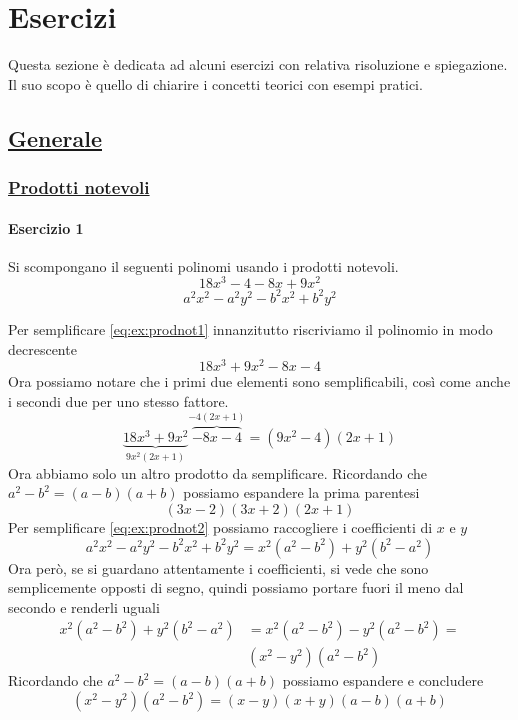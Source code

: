 
\section{Esercizi}
Questa sezione è dedicata ad alcuni esercizi con relativa risoluzione e spiegazione. Il suo scopo
è quello di chiarire i concetti teorici con esempi pratici.

\subsection*{\hyperref[sec:gen]{Generale}}\label{ex:generale}

\subsubsection*{\hyperref[subsec:gen:prodnot]{Prodotti notevoli}}
\paragraph{Esercizio 1}
Si scompongano il seguenti polinomi usando i prodotti notevoli.
\begin{equation}\label{eq:ex:prodnot1}
18x^3 - 4 -8x + 9x^2
\end{equation}
\begin{equation}\label{eq:ex:prodnot2}
a^2x^2 - a^2y^2 - b^2x^2 + b^2y^2
\end{equation}
\setcounter{equation}{0}
\divisor

Per semplificare \eqref{eq:ex:prodnot1} innanzitutto riscriviamo il polinomio in modo decrescente
\begin{equation*}
18x^3 + 9x^2- 8x - 4
\end{equation*}
Ora possiamo notare che i primi due elementi sono semplificabili, così come anche i secondi due per 
uno stesso fattore.
\begin{equation*}
\underbrace{18x^3 + 9x^2}_{9x^2(2x + 1)} \overbrace{- 8x - 4}^{-4(2x + 1)} = 
(9x^2 - 4)(2x + 1)
\end{equation*}
Ora abbiamo solo un altro prodotto da semplificare. Ricordando che $a^2-b^2 = (a-b)(a+b)$ possiamo
espandere la prima parentesi
\begin{equation*}
\boxed{(3x-2)(3x+2)(2x+1)}
\end{equation*}
Per semplificare \eqref{eq:ex:prodnot2} possiamo raccogliere i coefficienti di $x$ e $y$
\begin{equation*}
a^2x^2 - a^2y^2 - b^2x^2 + b^2y^2 = x^2(a^2-b^2) + y^2(b^2-a^2)
\end{equation*}
Ora però, se si guardano attentamente i coefficienti, si vede che sono semplicemente opposti di segno,
quindi possiamo portare fuori il meno dal secondo e renderli uguali
\begin{align*}
x^2(a^2-b^2) + y^2(b^2-a^2) &= x^2(a^2-b^2) -y^2(a^2-b^2) =\\ &(x^2 - y^2)(a^2-b^2)
\end{align*}
Ricordando che $a^2-b^2 = (a-b)(a+b)$ possiamo espandere e concludere
\begin{equation*}
(x^2 - y^2)(a^2-b^2) = \boxed{(x-y)(x+y)(a-b)(a+b)}
\end{equation*}

